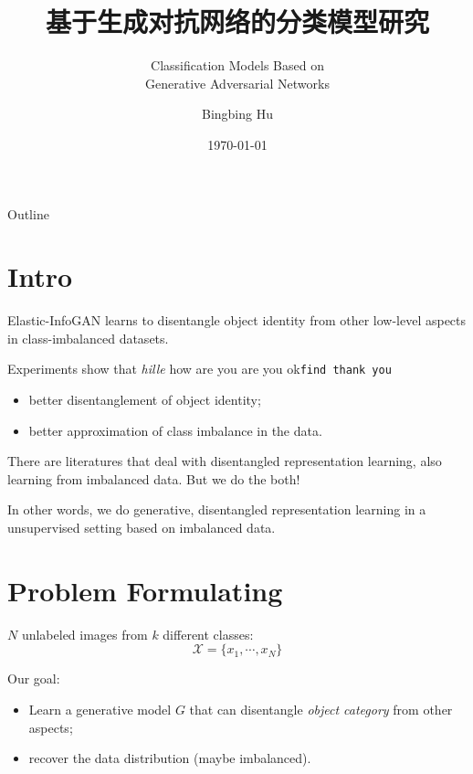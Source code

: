 \documentclass[xcolor={svgnames}]{beamer}
\title{基于生成对抗网络的分类模型研究}
\subtitle{Classification Models Based on \\ Generative Adversarial Networks}
\author{Bingbing Hu}
\institute{SIST, ShanghaiTech}
\date{\today}
\begin{document}

\begin{frame}{Outline}
\tableofcontents
\end{frame}

\section{Intro}
 

\begin{frame}
  Elastic-InfoGAN learns to disentangle object identity from other low-level 
  aspects in class-imbalanced datasets.

  Experiments show that \textit{hille} \textsf{how are you}
  \textrm{are you ok}\texttt{find thank you}
  \begin{itemize}
    \item better disentanglement of object identity;
    \item better approximation of class imbalance in the data.
  \end{itemize}
\end{frame}




\begin{frame}
  There are literatures that deal with disentangled representation learning,
  also learning from imbalanced data. But we do the both!

  In other words, we do \alert{generative}, \alert{disentangled} representation
  learning in a \alert{unsupervised} setting based on \alert{imbalanced} data.
\end{frame}


\section{Problem Formulating}
\begin{frame}
  $N$ unlabeled images from $k$ different classes:
  \[
    \mathcal{X} = \{x_1, \cdots, x_N\}
  \]

  Our goal:
  \begin{itemize}
    \item Learn a generative model $G$ that can disentangle \emph{object category}
      from other aspects;
    \item recover the data distribution (maybe imbalanced).
  \end{itemize}
\end{frame}
\end{document}
